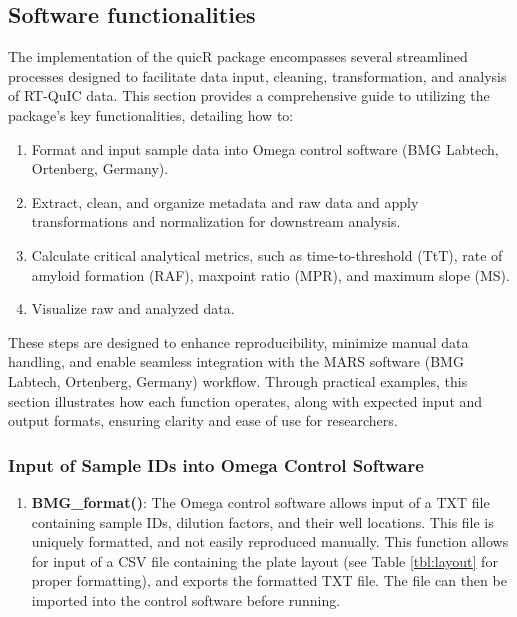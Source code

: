 \documentclass[preprint,12pt,a4paper]{elsarticle}
\begin{document}
    \subsection{Software functionalities}
        The implementation of the quicR package encompasses several streamlined processes designed to facilitate data input, cleaning, transformation, and analysis of RT-QuIC data. This section provides a comprehensive guide to utilizing the package's key functionalities, detailing how to:
            
        \begin{enumerate}
            \item Format and input sample data into Omega control software (BMG Labtech, Ortenberg, Germany).
            \item Extract, clean, and organize metadata and raw data and apply transformations and normalization for downstream analysis.
            \item Calculate critical analytical metrics, such as time-to-threshold (TtT), rate of amyloid formation (RAF), maxpoint ratio (MPR), and maximum slope (MS).
            \item Visualize raw and analyzed data.
        \end{enumerate}

        These steps are designed to enhance reproducibility, minimize manual data handling, and enable seamless integration with the MARS software (BMG Labtech, Ortenberg, Germany) workflow. Through practical examples, this section illustrates how each function operates, along with expected input and output formats, ensuring clarity and ease of use for researchers.

        \subsubsection{Input of Sample IDs into Omega Control Software}
            \begin{enumerate}
                \item \textbf{BMG\_format()}: The Omega control software allows input of a TXT file containing sample IDs, dilution factors, and their well locations. This file is uniquely formatted, and not easily reproduced manually. This function allows for input of a CSV file containing the plate layout (see Table \ref{tbl:layout} for proper formatting), and exports the formatted TXT file. The file can then be imported into the control software before running.
            \end{enumerate}
            
\end{document}
